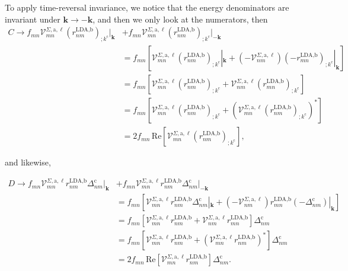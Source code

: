 To apply time-reversal invariance,
we notice that the energy denominators are 
invariant under $\mathbf{k} \rightarrow - \mathbf{k}$, 
and then we only look at the numerators, then 
\begin{align}\label{ct}
C \rightarrow f_{mn}\mathcal{V}^{\Sigma,\text{a},\ell}_{mn}\left(r^{\text{LDA,b}}_{nm}\right)_{;k^{\text{c}}}|_{\mathbf{k}}
&+ f_{mn}\mathcal{V}^{\Sigma,\text{a},\ell}_{mn}\left(r^{\text{LDA,b}}_{nm}\right)_{;k^{\text{c}}}|_{-\mathbf{k}}\nonumber\\
&= f_{mn}\left[\mathcal{V}^{\Sigma,\text{a},\ell}_{mn}\left(r^{\text{LDA,b}}_{nm}\right)_{;k^{\text{c}}}|_{\mathbf{k}} + \left(-\mathcal{V}^{\Sigma,\text{a},\ell}_{nm}\right)\left(-r^{\text{LDA,b}}_{mn}\right)_{;k^{\text{c}}}|_{\mathbf{k}}\right]\nonumber\\
&= f_{mn}\left[\mathcal{V}^{\Sigma,\text{a},\ell}_{mn}\left(r^{\text{LDA,b}}_{nm}\right)_{;k^{\text{c}}} + \mathcal{V}^{\Sigma,\text{a},\ell}_{nm}\left(r^{\text{LDA,b}}_{mn}\right)_{;k^{\text{c}}}\right]\nonumber\\
&= f_{mn}\left[\mathcal{V}^{\Sigma,\text{a},\ell}_{mn}\left(r^{\text{LDA,b}}_{nm}\right)_{;k^{\text{c}}} + \left(\mathcal{V}^{\Sigma,\text{a},\ell}_{mn}\left(r^{\text{LDA,b}}_{nm}\right)_{;k^{\text{c}}}\right)^*\right]\nonumber\\
&= 2f_{mn}\,\mathrm{Re}\left[\mathcal{V}^{\Sigma,\text{a},\ell}_{mn}\left(r^{\text{LDA,b}}_{nm}\right)_{;k^{\text{c}}}\right],
\end{align}

and likewise,

\begin{align}\label{dt}
D \rightarrow f_{mn}\mathcal{V}^{\Sigma,\text{a},\ell}_{mn}r^{\text{LDA,b}}_{nm}\Delta^{\text{c}}_{nm}|_{\mathbf{k}} 
&+ f_{mn}\mathcal{V}^{\Sigma,\text{a},\ell}_{mn}r^{\text{LDA,b}}_{nm}\Delta^{\text{c}}_{nm}|_{-\mathbf{k}}\nonumber\\
&= f_{mn}\left[\mathcal{V}^{\Sigma,\text{a},\ell}_{mn}r^{\text{LDA,b}}_{nm}\Delta^{\text{c}}_{nm}|_{\mathbf{k}} + \left(-\mathcal{V}^{\Sigma,\text{a},\ell}_{nm}\right)r^{\text{LDA,b}}_{mn}\left(-\Delta^{\text{c}}_{nm}\right)|_{\mathbf{k}}\right]\nonumber\\
&= f_{mn}\left[\mathcal{V}^{\Sigma,\text{a},\ell}_{mn}r^{\text{LDA,b}}_{nm} + \mathcal{V}^{\Sigma,\text{a},\ell}_{nm}r^{\text{LDA,b}}_{mn}\right]\Delta^{\text{c}}_{nm}\nonumber\\
&= f_{mn}\left[\mathcal{V}^{\Sigma,\text{a},\ell}_{mn}r^{\text{LDA,b}}_{nm} + \left(\mathcal{V}^{\Sigma,\text{a},\ell}_{mn}r^{\text{LDA,b}}_{nm}\right)^*\right]\Delta^{\text{c}}_{nm}\nonumber\\
&= 2f_{mn}\,\mathrm{Re}\left[\mathcal{V}^{\Sigma,\text{a},\ell}_{mn}r^{\text{LDA,b}}_{nm}\right]\Delta^{\text{c}}_{nm}.
\end{align}

